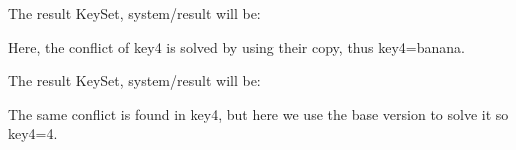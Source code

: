 \begin{DoxyCode}{0}
\end{DoxyCode}


The result Key\+Set, {\ttfamily system/result} will be\+:


\begin{DoxyCode}{0}
\end{DoxyCode}


Here, the conflict of {\ttfamily key4} is solved by using their copy, thus {\ttfamily key4=banana}.


\begin{DoxyCode}{0}
\end{DoxyCode}


The result Key\+Set, {\ttfamily system/result} will be\+:


\begin{DoxyCode}{0}
\end{DoxyCode}


The same conflict is found in {\ttfamily key4}, but here we use the {\ttfamily base} version to solve it so {\ttfamily key4=4}. 